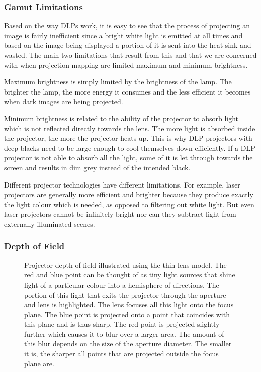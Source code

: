 \subsubsection{Gamut Limitations}
\label{section:background-projection_mapping-projectors-limitations}

Based on the way DLPs work, it is easy to see that the process of projecting an image is fairly inefficient since a bright white light is emitted at all times and based on the image being displayed a portion of it is sent into the heat sink and wasted. The main two limitations that result from this and that we are concerned with when projection mapping are limited maximum and minimum brightness.

Maximum brightness is simply limited by the brightness of the lamp. The brighter the lamp, the more energy it consumes and the less efficient it becomes when dark images are being projected.

Minimum brightness is related to the ability of the projector to absorb light which is not reflected directly towards the lens. The more light is absorbed inside the projector, the more the projector heats up. This is why DLP projectors with deep blacks need to be large enough to cool themselves down efficiently. If a DLP projector is not able to absorb all the light, some of it is let through towards the screen and results in dim grey instead of the intended black.

Different projector technologies have different limitations. For example, laser projectors are generally more efficient and brighter because they produce exactly the light colour which is needed, as opposed to filtering out white light. But even laser projectors cannot be infinitely bright nor can they subtract light from externally illuminated scenes.

\subsubsection{Depth of Field}
\label{section:background-projection_mapping-projectors-dof}

\begin{figure}[t]
    \centering
    \def\svgwidth{0.8\textwidth}
    
    \caption{Projector depth of field illustrated using the thin lens model. The red and blue point can be thought of as tiny light sources that shine light of a particular colour into a hemisphere of directions. The portion of this light that exits the projector through the aperture and lens is highlighted. The lens focuses all this light onto the focus plane. The blue point is projected onto a point that coincides with this plane and is thus sharp. The red point is projected slightly further which causes it to blur over a larger area. The amount of this blur depends on the size of the aperture diameter. The smaller it is, the sharper all points that are projected outside the focus plane are.}
    \label{fig:background_thin_lens}
\end{figure}

